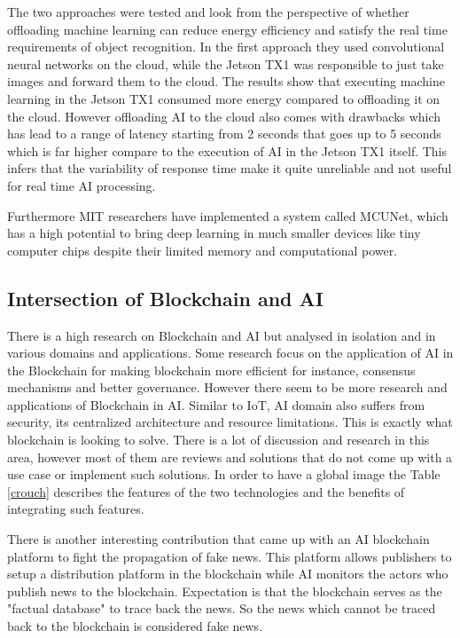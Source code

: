 The two approaches were tested and look from the perspective of whether offloading machine learning can reduce energy efficiency and satisfy the real time requirements of object recognition. 
In the first approach they used convolutional neural networks on the cloud, while the Jetson TX1 was responsible to just take images and forward them to the cloud. The results show that executing machine learning in the Jetson TX1 consumed more energy compared to offloading it on the cloud. However offloading AI to the cloud also comes with drawbacks which has lead to a range of latency starting from 2 seconds that goes up to 5 seconds which is far higher compare to the execution of AI in the Jetson TX1 itself. This infers that the variability of response time make it quite unreliable and not useful for real time AI processing. 

Furthermore MIT researchers \cite{mit123} have implemented a system called MCUNet, which has a high potential to bring deep learning in much smaller devices like tiny computer chips despite their limited memory and computational power. 

\subsection{Intersection of Blockchain and AI}

There is a high research on Blockchain and AI but analysed in isolation and in various domains and applications. Some research \cite{8481263} focus on the application of AI in the Blockchain for making blockchain more efficient for instance, consensus mechanisms and better governance. However there seem to be more research and applications of Blockchain in AI. Similar to IoT, AI domain also suffers from security, its centralized architecture and resource limitations. This is exactly what blockchain is looking to solve. There is a lot of discussion and research in this area, however most of them are reviews and solutions that do not come up with a use case or implement such solutions. In order to have a global image the Table \ref{crouch} describes the features of the two technologies and the benefits of integrating such features.

There is another interesting contribution \cite{8884985} that came up with an AI blockchain platform to fight the propagation of fake news. This platform allows publishers to setup a distribution platform in the blockchain while AI monitors the actors who publish news to the blockchain. Expectation is that the blockchain serves as the "factual database" to trace back the news. So the news which cannot be traced back to the blockchain is considered fake news. 





